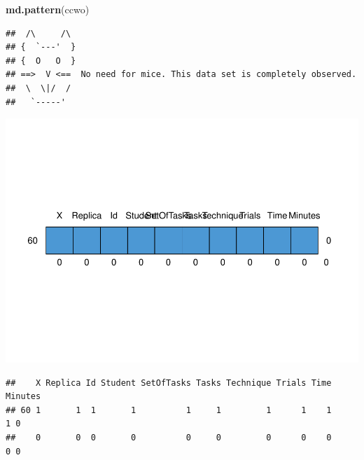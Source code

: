 \documentclass[]{article}
\title{}
\author{}
\date{}
\newenvironment{Shaded}{\begin{snugshade}}{\end{snugshade}}
\newcommand{\DecValTok}[1]{\textcolor[rgb]{0.00,0.00,0.81}{#1}}
\newcommand{\KeywordTok}[1]{\textcolor[rgb]{0.13,0.29,0.53}{\textbf{#1}}}
\newcommand{\NormalTok}[1]{#1}
\newcommand{\OperatorTok}[1]{\textcolor[rgb]{0.81,0.36,0.00}{\textbf{#1}}}
\newcommand{\OtherTok}[1]{\textcolor[rgb]{0.56,0.35,0.01}{#1}}
\newcommand{\StringTok}[1]{\textcolor[rgb]{0.31,0.60,0.02}{#1}}
\begin{document}
\begin{Shaded}
\end{Shaded}

\begin{Shaded}
\begin{Highlighting}[]
\KeywordTok{md.pattern}\NormalTok{(ccwo)}
\end{Highlighting}
\end{Shaded}

\begin{verbatim}
##  /\     /\
## {  `---'  }
## {  O   O  }
## ==>  V <==  No need for mice. This data set is completely observed.
##  \  \|/  /
##   `-----'
\end{verbatim}

\includegraphics{main_files/figure-latex/unnamed-chunk-2-1.pdf}

\begin{verbatim}
##    X Replica Id Student SetOfTasks Tasks Technique Trials Time Minutes  
## 60 1       1  1       1          1     1         1      1    1       1 0
##    0       0  0       0          0     0         0      0    0       0 0
\end{verbatim}
\end{document}
